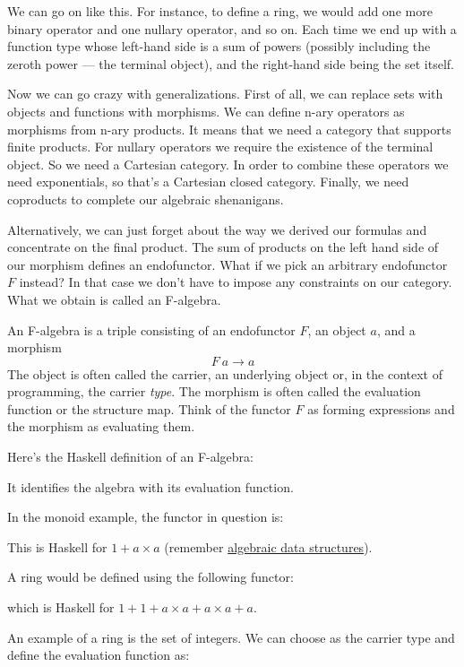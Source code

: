 We can go on like this. For instance, to define a ring, we would add one
more binary operator and one nullary operator, and so on. Each time we
end up with a function type whose left-hand side is a sum of powers
(possibly including the zeroth power --- the terminal object), and the
right-hand side being the set itself.

Now we can go crazy with generalizations. First of all, we can replace
sets with objects and functions with morphisms. We can define n-ary
operators as morphisms from n-ary products. It means that we need a
category that supports finite products. For nullary operators we require
the existence of the terminal object. So we need a Cartesian category.
In order to combine these operators we need exponentials, so that's a
Cartesian closed category. Finally, we need coproducts to complete our
algebraic shenanigans.

Alternatively, we can just forget about the way we derived our formulas
and concentrate on the final product. The sum of products on the left
hand side of our morphism defines an endofunctor. What if we pick an
arbitrary endofunctor $F$ instead? In that case we don't have to
impose any constraints on our category. What we obtain is called an
F-algebra.

An F-algebra is a triple consisting of an endofunctor $F$, an
object $a$, and a morphism
\[F\ a \to a\]
The object is often called the carrier, an underlying object or, in the
context of programming, the carrier \emph{type}. The morphism is often
called the evaluation function or the structure map. Think of the
functor $F$ as forming expressions and the morphism as evaluating
them.

Here's the Haskell definition of an F-algebra:

It identifies the algebra with its evaluation function.

In the monoid example, the functor in question is:

This is Haskell for $1 + a\times{}a$ (remember
\hyperref[simple-algebraic-data-types]{algebraic
data structures}).

A ring would be defined using the following functor:

which is Haskell for $1 + 1 + a\times{}a + a\times{}a + a$.

An example of a ring is the set of integers. We can choose
 as the carrier type and define the evaluation function
as:


